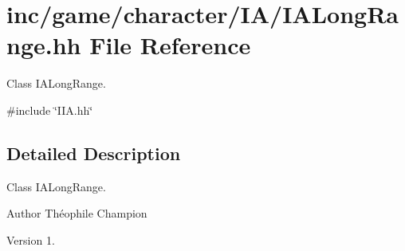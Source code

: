 \hypertarget{IALongRange_8hh}{}\section{inc/game/character/\+I\+A/\+I\+A\+Long\+Range.hh File Reference}
\label{IALongRange_8hh}


Class I\+A\+Long\+Range.  


{\ttfamily \#include \char`\"{}I\+I\+A.\+hh\char`\"{}}\newline


\subsection{Detailed Description}
Class I\+A\+Long\+Range. 

\begin{DoxyAuthor}{Author}
Théophile Champion 
\end{DoxyAuthor}
\begin{DoxyVersion}{Version}
1. 
\end{DoxyVersion}
